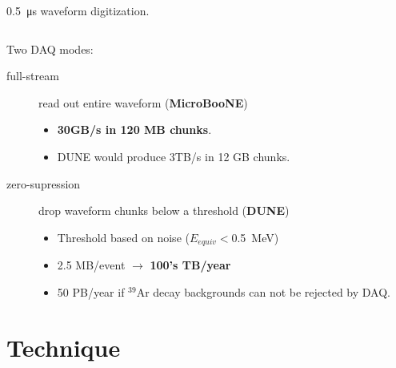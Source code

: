\documentclass[xcolor=dvipsnames]{beamer}
\begin{document}
\begin{frame}
\begin{columns}
\begin{column}{0.2\textwidth}
\begin{center}
        \scriptsize \SI{0.5}{\micro\second} waveform digitization.
      \end{center}
    \end{column}
  \end{columns}

  \vspace{-5mm}

  \footnotesize
  Two DAQ modes:
  \begin{description}
  \item[full-stream] read out entire waveform (\textbf{MicroBooNE})
    \begin{itemize}
    \item \textbf{30GB/s in 120 MB chunks}.
    \item DUNE would produce 3TB/s in 12 GB chunks.
    \end{itemize}
  \item[zero-supression] drop waveform chunks below a threshold (\textbf{DUNE})
    \begin{itemize}
    \item Threshold based on noise ($E_{equiv} <$\SI{0.5}{\mega\electronvolt})
    \item 2.5 MB/event $\rightarrow$ \textbf{100's TB/year}
    \item 50 PB/year if $^{39}$Ar decay backgrounds can not be
      rejected by DAQ.
    \end{itemize}
  \end{description}

\end{frame}


\section{Technique}
\end{document}
